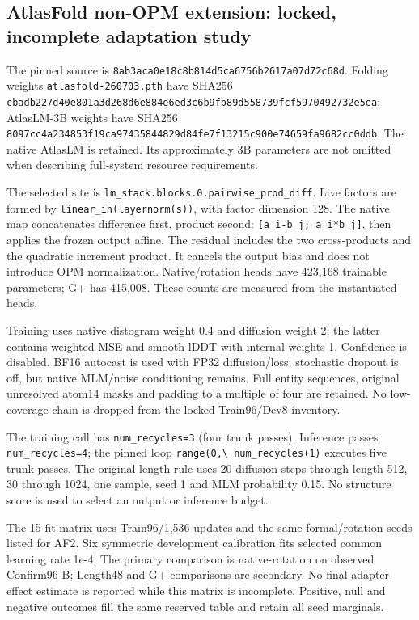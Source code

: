 \subsection{AtlasFold non-OPM extension: locked, incomplete adaptation study}\label{atlasfold-non-opm-extension-locked-incomplete-adaptation-study}

The pinned source is \nolinkurl{8ab3aca0e18c8b814d5ca6756b2617a07d72c68d}. Folding weights
\nolinkurl{atlasfold-260703.pth} have SHA256
\nolinkurl{cbadb227d40e801a3d268d6e884e6ed3c6b9fb89d558739fcf5970492732e5ea};
AtlasLM-3B weights have SHA256
\nolinkurl{8097cc4a234853f19ca97435844829d84fe7f13215c900e74659fa9682cc0ddb}.
The native AtlasLM is retained. Its approximately 3B parameters are not omitted
when describing full-system resource requirements.

The selected site is \nolinkurl{lm_stack.blocks.0.pairwise_prod_diff}. Live factors are
formed by \nolinkurl{linear_in(layernorm(s))}, with factor dimension 128. The native map
concatenates difference first, product second: \texttt{{[}a\_i-b\_j;\ a\_i*b\_j{]}}, then applies
the frozen output affine. The residual includes the two cross-products and the
quadratic increment product. It cancels the output bias and does not introduce
OPM normalization. Native/rotation heads have 423,168 trainable parameters;
G+ has 415,008. These counts are measured from the instantiated heads.

Training uses native distogram weight 0.4 and diffusion weight 2; the latter
contains weighted MSE and smooth-lDDT with internal weights 1. Confidence is
disabled. BF16 autocast is used with FP32 diffusion/loss; stochastic dropout is
off, but native MLM/noise conditioning remains. Full entity sequences, original
unresolved atom14 masks and padding to a multiple of four are retained.
No low-coverage chain is dropped from the locked Train96/Dev8 inventory.

The training call has \nolinkurl{num_recycles=3} (four trunk passes). Inference passes
\nolinkurl{num_recycles=4}; the pinned loop \nolinkurl{range(0,\ num_recycles+1)} executes five trunk
passes. The original length rule uses 20 diffusion steps through length 512,
30 through 1024, one sample, seed 1 and MLM probability 0.15. No structure score
is used to select an output or inference budget.

The 15-fit matrix uses Train96/1,536 updates and the same formal/rotation seeds
listed for AF2. Six symmetric development calibration fits selected common
learning rate 1e-4. The primary comparison is native-rotation on observed
Confirm96-B; Length48 and G+ comparisons are secondary. No final adapter-effect
estimate is reported while this matrix is incomplete. Positive, null and
negative outcomes fill the same reserved table and retain all seed marginals.

